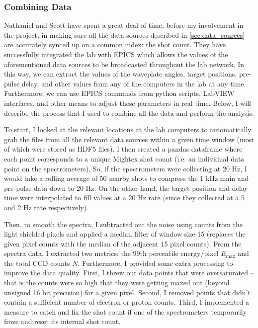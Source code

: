 \subsubsection{Combining Data}

Nathaniel and Scott have spent a great deal of time, before my involvement in the project, in making sure all the data sources described in \autoref{sec:data_sources} are accurately synced up on a common index: the shot count. They have successfully integrated the lab with \gls{EPICS} which allows the values of the aforementioned data sources to be broadcasted throughout the lab network. In this way, we can extract the values of the waveplate angles, target positions, pre-pulse delay, and other values from any of the computers in the lab at any time. Furthermore, we can use \gls{EPICS} commands from python scripts, LabVIEW interfaces, and other means to adjust these parameters in real time. Below, I will describe the process that I used to combine all the data and perform the analysis. 

To start, I looked at the relevant locations at the lab computers to automatically grab the files from all the relevant data sources within a given time window (most of which were stored as \gls{HDF5} files). I then created a pandas dataframe where each point corresponds to a unique Mightex shot count (i.e. an individual data point on the spectrometers). So, if the spectrometers were collecting at 20 Hz, I would take a rolling average of 50 nearby shots to compress the 1 kHz main and pre-pulse data down to 20 Hz. On the other hand, the target position and delay time were interpolated to fill values at a 20 Hz rate (since they collected at a 5 and 2 Hz rate respectively).

Then, to smooth the spectra, I subtracted out the noise using counts from the light shielded pixels and applied a median filter of window size 15 (replaces the given pixel counts with the median of the adjacent 15 pixel counts). From the spectra data, I extracted two metrics: the 99th percentile energy/pixel $E_\text{max}$ and the total \gls{CCD} counts $N$. Furthermore, I provided some extra processing to improve the data quality. First, I threw out data points that were oversaturated -- that is the counts were so high that they were getting maxed out (beyond unsigned 16 bit precision) for a given pixel. Second, I removed points that didn't contain a sufficient number of electron or proton counts. Third, I implemented a measure to catch and fix the shot count if one of the spectrometers temporarily froze and reset its internal shot count. 

